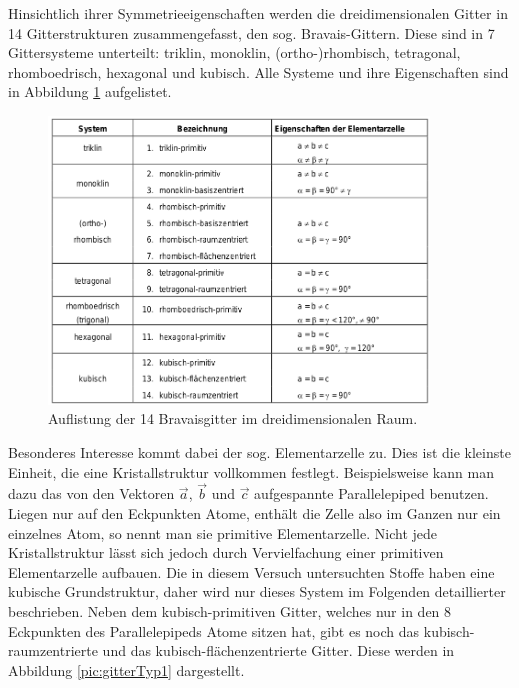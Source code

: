 Hinsichtlich ihrer Symmetrieeigenschaften werden die dreidimensionalen Gitter in 14 Gitterstrukturen zusammengefasst, den sog. Bravais-Gittern. Diese sind in 7 Gittersysteme unterteilt: triklin, monoklin, (ortho-)rhombisch, tetragonal, rhomboedrisch, hexagonal und kubisch. Alle Systeme und ihre Eigenschaften sind in Abbildung \ref{pic:bravais} aufgelistet.
\begin{figure}[htbp]
	\includegraphics[width=0.9\textwidth]{../pics/bravais.png}
	\caption{Auflistung der 14 Bravaisgitter im dreidimensionalen Raum.}
	\label{pic:bravais}
\end{figure}

Besonderes Interesse  kommt dabei der sog. Elementarzelle zu. Dies ist die kleinste Einheit, die eine Kristallstruktur vollkommen festlegt. Beispielsweise kann man dazu das von den Vektoren $\vec{a}$, $\vec{b}$ und $\vec{c}$ aufgespannte Parallelepiped benutzen. Liegen nur auf den Eckpunkten Atome, enthält die Zelle also im Ganzen nur ein einzelnes Atom, so nennt man sie primitive Elementarzelle. 
Nicht jede Kristallstruktur lässt sich jedoch durch Vervielfachung einer primitiven Elementarzelle aufbauen. Die in diesem Versuch untersuchten Stoffe haben eine kubische Grundstruktur, daher wird nur dieses System im Folgenden detaillierter beschrieben. Neben dem kubisch-primitiven Gitter, welches nur in den 8 Eckpunkten des Parallelepipeds Atome sitzen hat, gibt es noch das kubisch-raumzentrierte und das kubisch-flächenzentrierte Gitter. Diese werden in Abbildung \ref{pic:gitterTyp1} dargestellt.

